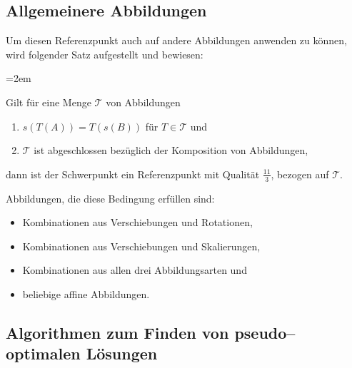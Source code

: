 \subsection{Allgemeinere Abbildungen}

Um diesen Referenzpunkt auch auf andere Abbildungen anwenden zu können, wird folgender Satz aufgestellt und bewiesen:

\par
\begingroup
\leftskip=2em 

Gilt für eine Menge $\mathcal{T}$  von Abbildungen 
\begin{enumerate}
\item $s(T(A))=T(s(B))$ für $T\in\mathcal{T}$ und 
\item $\mathcal{T}$ ist abgeschlossen bezüglich der Komposition von Abbildungen,
\end{enumerate}
dann ist der Schwerpunkt ein  Referenzpunkt mit Qualität $\frac{11}{3}$, bezogen auf $\mathcal{T}$.
\par
\endgroup
Abbildungen, die diese Bedingung erfüllen sind: 
\begin{itemize}
\item Kombinationen aus Verschiebungen und Rotationen,
\item Kombinationen aus Verschiebungen und Skalierungen,
\item Kombinationen aus allen drei Abbildungsarten und
\item beliebige affine Abbildungen.
\end{itemize}

\subsection{Algorithmen zum Finden von pseudo--optimalen Lösungen}

